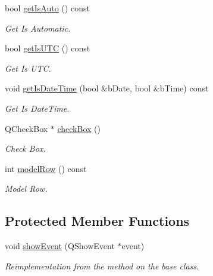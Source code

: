 \begin{DoxyCompactItemize}
bool \hyperlink{class_custom_time_ctrl_a98ae9f9f769258df322419ce26ac7778}{getIsAuto} () const 
\begin{DoxyCompactList}\small\item\em Get Is Automatic. \item\end{DoxyCompactList}\item 
bool \hyperlink{class_custom_time_ctrl_a13d9d91b005bf7e9a585d5a49bba248c}{getIsUTC} () const 
\begin{DoxyCompactList}\small\item\em Get Is UTC. \item\end{DoxyCompactList}\item 
void \hyperlink{class_custom_time_ctrl_a87f05c08ece39484cbad24441f890d3c}{getIsDateTime} (bool \&bDate, bool \&bTime) const 
\begin{DoxyCompactList}\small\item\em Get Is DateTime. \item\end{DoxyCompactList}\item 
QCheckBox $\ast$ \hyperlink{class_custom_time_ctrl_a733c68c7cf18771530e05c55c0a2e3c0}{checkBox} ()
\begin{DoxyCompactList}\small\item\em Check Box. \item\end{DoxyCompactList}\item 
int \hyperlink{class_custom_time_ctrl_a3232a13b5a09af8d908162f5a3369f4c}{modelRow} () const 
\begin{DoxyCompactList}\small\item\em Model Row. \item\end{DoxyCompactList}\end{DoxyCompactItemize}
\subsection*{Protected Member Functions}
\begin{DoxyCompactItemize}
\item 
void \hyperlink{class_custom_time_ctrl_a32f81c6822f07b034d7291a4792bb936}{showEvent} (QShowEvent $\ast$event)
\begin{DoxyCompactList}\small\item\em Reimplementation from the method on the base class. \item\end{DoxyCompactList}\end{DoxyCompactItemize}
